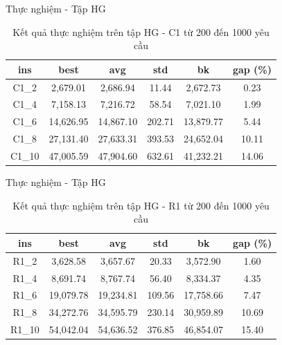 \begin{frame}{Thực nghiệm - Tập HG}
  \begin{table}
    \begin{tabular}{cccccc}
      \hline
      ins & best & avg & std & bk & gap (\%) \\ \hline
      C1\_2 & 2,679.01 & 2,686.94 & 11.44 & 2,672.73 & 0.23 \\ \hline
      C1\_4 & 7,158.13 & 7,216.72 & 58.54 & 7,021.10 & 1.99 \\ \hline
      C1\_6 & 14,626.95 & 14,867.10 & 202.71 & 13,879.77 & 5.44 \\ \hline
      C1\_8 & 27,131.40 & 27,633.31 & 393.53 & 24,652.04 & 10.11 \\ \hline
      C1\_10 & 47,005.59 & 47,904.60 & 632.61 & 41,232.21 & 14.06 \\ \hline
    \end{tabular}
    \caption{Kết quả thực nghiệm trên tập HG - C1 từ 200 đến 1000 yêu cầu}
  \end{table}
\end{frame}

\begin{frame}{Thực nghiệm - Tập HG}
  \begin{table}
    \begin{tabular}{cccccc}
      \hline
      ins & best & avg & std & bk & gap (\%) \\ \hline
      R1\_2 & 3,628.58 &	3,657.67 &20.33	& 3,572.90	& 1.60 \\ \hline
      R1\_4 & 8,691.74 & 8,767.74 &	56.40	&	8,334.37	& 4.35 \\ \hline
      R1\_6 & 19,079.78 & 19,234.81 & 109.56 & 17,758.66 & 7.47 \\ \hline
      R1\_8 & 34,272.76 &	34,595.79	& 230.14	& 30,959.89	& 10.69 \\ \hline
      R1\_10 & 54,042.04 & 54,636.52 & 376.85	& 46,854.07	& 15.40 \\ \hline
    \end{tabular}
    \caption{Kết quả thực nghiệm trên tập HG - R1 từ 200 đến 1000 yêu cầu}
  \end{table}
\end{frame}

